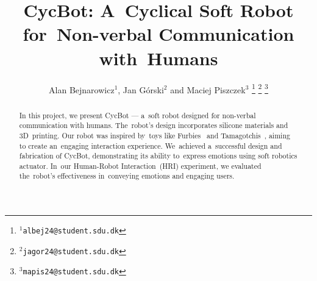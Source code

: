 \documentclass[a4paper, 10pt, conference]{ieeeconf}      %
\title{\LARGE \bf{CycBot: A~Cyclical Soft Robot for~Non-verbal Communication with~Humans}}
\begin{document}
\author{Alan Bejnarowicz$^{1}$, Jan Górski$^{2}$ and Maciej Piszczek$^{3}$%
\thanks{$^{1}${\tt\small albej24@student.sdu.dk}}%
\thanks{$^{2}${\tt\small jagor24@student.sdu.dk}}%
\thanks{$^{3}${\tt\small mapis24@student.sdu.dk}}%
}

\maketitle
\thispagestyle{empty}
\pagestyle{empty}


\begin{abstract}

In this project, we present CycBot --- a~soft robot designed for non-verbal communication with humans. The~robot's design incorporates silicone materials and 3D~printing. Our robot was inspired by~toys like Furbies~\cite{furby} and Tamagotchis~\cite{tamagotchi}, aiming to create an~engaging interaction experience. We~achieved a~successful design and fabrication of CycBot, demonstrating its ability to~express emotions using soft robotics actuator. In~our Human-Robot Interaction~(HRI) experiment, we evaluated the~robot's effectiveness in~conveying emotions and engaging users.

\end{abstract}












\addtolength{\textheight}{-12cm}   %



\printbibliography[title={References}]
\end{document}
